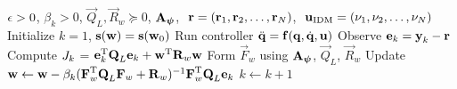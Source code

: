\begin{algorithm}[tb]
   \caption{\alg}
   \label{alg1}
\begin{algorithmic}
    $\threshold > 0$, $\beta_k > 0$, $\vec{Q}_L, \vec{R}_{w} \succeq 0$, $\vec{A}_{\fullvec}$, $\ \traj = (\traj_1, \traj_2, \ldots, \traj_N)$, $\ \sysInput_{\mathrm{IDM}} = (\nu_1, \nu_2, \ldots, \nu_N)$
   \STATE Initialize $k = 1$, $\dmp(\weights) = \dmp(\weights_0)$
   \REPEAT 
 	   \STATE Run controller $\ddot{\joint} = \dynamics(\joint,\dot{\joint},\sysInput)$ %
 	   \STATE Observe $\error_k = \state_k - \traj$
 	   \STATE Compute $\ValueFunction_k$ = $\error_k^{\mathrm{T}}\vec{Q}_L\error_k + \weights^{\mathrm{T}}\vec{R}_w\weights$
 	   \STATE Form $\vec{F}_w$ using $\vec{A}_{\fullvec}$, $\vec{Q}_L$, $\vec{R}_{w}$
 	   \STATE Update $\weights \leftarrow \weights - \beta_k(\vec{F}_{w}^{\mathrm{T}}\vec{Q}_L\vec{F}_{w} + \vec{R}_{w})^{-1}\vec{F}_{w}^{\mathrm{T}}\vec{Q}_L\error_k$
 	   \STATE $k \leftarrow k + 1$
\end{algorithmic}
\end{algorithm}